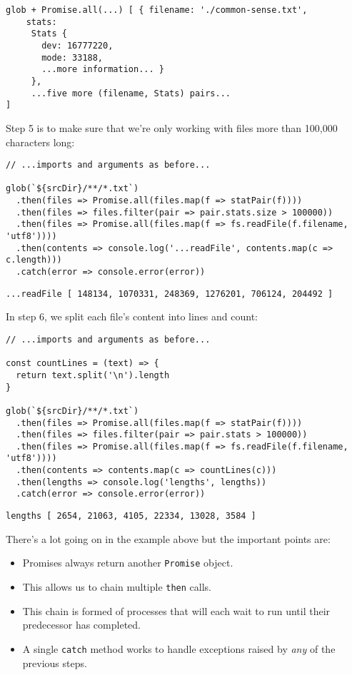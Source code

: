 \begin{verbatim}
glob + Promise.all(...) [ { filename: './common-sense.txt',
    stats:
     Stats {
       dev: 16777220,
       mode: 33188,
       ...more information... }
     },
     ...five more (filename, Stats) pairs...
]
\end{verbatim}

Step 5 is to make sure that
we're only working with files more than 100,000 characters long:

\begin{verbatim}
// ...imports and arguments as before...

glob(`${srcDir}/**/*.txt`)
  .then(files => Promise.all(files.map(f => statPair(f))))
  .then(files => files.filter(pair => pair.stats.size > 100000))
  .then(files => Promise.all(files.map(f => fs.readFile(f.filename, 'utf8'))))
  .then(contents => console.log('...readFile', contents.map(c => c.length)))
  .catch(error => console.error(error))
\end{verbatim}

\begin{verbatim}
...readFile [ 148134, 1070331, 248369, 1276201, 706124, 204492 ]
\end{verbatim}

In step 6,
we split each file's content into lines and count:

\begin{verbatim}
// ...imports and arguments as before...

const countLines = (text) => {
  return text.split('\n').length
}

glob(`${srcDir}/**/*.txt`)
  .then(files => Promise.all(files.map(f => statPair(f))))
  .then(files => files.filter(pair => pair.stats > 100000))
  .then(files => Promise.all(files.map(f => fs.readFile(f.filename, 'utf8'))))
  .then(contents => contents.map(c => countLines(c)))
  .then(lengths => console.log('lengths', lengths))
  .catch(error => console.error(error))
\end{verbatim}

\begin{verbatim}
lengths [ 2654, 21063, 4105, 22334, 13028, 3584 ]
\end{verbatim}

There's a lot going on in the example above
but the important points are:

\begin{itemize}
\item
  Promises always return another \texttt{Promise} object.
\item
  This allows us to chain multiple \texttt{then} calls.
\item
  This chain is formed of processes that will each wait to run until their predecessor has completed.
\item
  A single \texttt{catch} method works to handle exceptions raised by \emph{any} of the previous steps.
\end{itemize}

